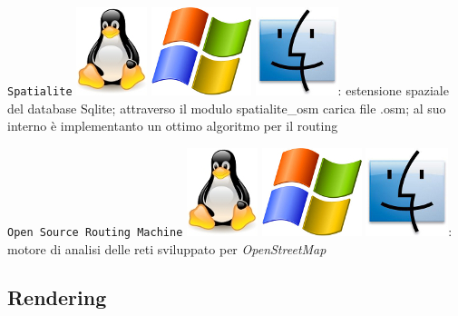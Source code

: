 \documentclass[a4paper,twoside,12pt,]{article}
\newcommand{\osm}{\emph{OpenStreetMap}\xspace}
\newcommand{\soft}[1]{\texttt{#1}}
\begin{document}
\soft{Spatialite} \includegraphics{./linux-logo.jpg} \includegraphics{./windows-logo.jpg} \includegraphics{./mac-logo.jpg}: estensione spaziale del database Sqlite; attraverso il modulo spatialite\_osm carica file .osm; al suo interno è implementanto un ottimo algoritmo per il routing

\soft{Open Source Routing Machine} \includegraphics{./linux-logo.jpg} \includegraphics{./windows-logo.jpg} \includegraphics{./mac-logo.jpg}: motore di analisi delle reti sviluppato per \osm


\subsection{Rendering}
\end{document}
